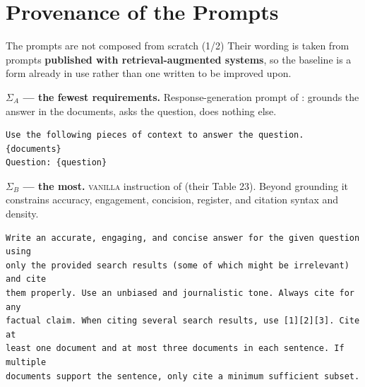 \documentclass[11pt,aspectratio=169]{beamer}
\begin{document}
\section{Provenance of the Prompts}
\label{sec:prov}

\begin{frame}[fragile]{The prompts are not composed from scratch (1/2)}
  Their wording is taken from prompts \textbf{published with retrieval-augmented
  systems}, so the baseline is a form already in use rather than one written
  to be improved upon.
  \medskip

  \textbf{$\Sigma_A$ --- the fewest requirements.} Response-generation prompt
  of \citet{friel2024ragbench}: grounds the answer in the documents, asks the
  question, does nothing else.
\begin{lstlisting}[style=promptbox]
Use the following pieces of context to answer the question.
{documents}
Question: {question}
\end{lstlisting}
  \medskip
  \textbf{$\Sigma_B$ --- the most.} \textsc{vanilla} instruction of
  \citet{gao2023alce} (their Table 23). Beyond grounding it constrains
  accuracy, engagement, concision, register, and citation syntax and density.
\begin{lstlisting}[style=promptbox]
Write an accurate, engaging, and concise answer for the given question using
only the provided search results (some of which might be irrelevant) and cite
them properly. Use an unbiased and journalistic tone. Always cite for any
factual claim. When citing several search results, use [1][2][3]. Cite at
least one document and at most three documents in each sentence. If multiple
documents support the sentence, only cite a minimum sufficient subset.
\end{lstlisting}
\end{frame}
\end{document}
